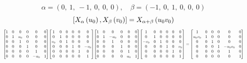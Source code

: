 \documentclass[11pt]{article}
\theoremstyle{definition}
\begin{document}
\[
\alpha = \left( 0, \  1, \  -1, \  0, \  0, \  0\right), \quad \beta = \left( -1, \  0, \  1, \  0, \  0, \  0\right)
\]
\[
\scaletoalign{\textwidth}{\left[ X_{\alpha}\left(u_{0}\right), X_{\beta}\left(v_{0}\right) \right] = X_{\alpha + \beta}\left(u_{0} v_{0}\right)}
\]
\[
\scaletoalign{\textwidth}{{\left[\begin{matrix}1 & 0 & 0 & 0 & 0 & 0\\0 & 1 & u_{0} & 0 & 0 & 0\\0 & 0 & 1 & 0 & 0 & 0\\0 & 0 & 0 & 1 & 0 & 0\\0 & 0 & 0 & 0 & 1 & 0\\0 & 0 & 0 & 0 & - u_{0} & 1\end{matrix}\right]} {\left[\begin{matrix}1 & 0 & 0 & 0 & 0 & 0\\0 & 1 & 0 & 0 & 0 & 0\\v_{0} & 0 & 1 & 0 & 0 & 0\\0 & 0 & 0 & 1 & 0 & - v_{0}\\0 & 0 & 0 & 0 & 1 & 0\\0 & 0 & 0 & 0 & 0 & 1\end{matrix}\right]} {\left[\begin{matrix}1 & 0 & 0 & 0 & 0 & 0\\0 & 1 & - u_{0} & 0 & 0 & 0\\0 & 0 & 1 & 0 & 0 & 0\\0 & 0 & 0 & 1 & 0 & 0\\0 & 0 & 0 & 0 & 1 & 0\\0 & 0 & 0 & 0 & u_{0} & 1\end{matrix}\right]} {\left[\begin{matrix}1 & 0 & 0 & 0 & 0 & 0\\0 & 1 & 0 & 0 & 0 & 0\\- v_{0} & 0 & 1 & 0 & 0 & 0\\0 & 0 & 0 & 1 & 0 & v_{0}\\0 & 0 & 0 & 0 & 1 & 0\\0 & 0 & 0 & 0 & 0 & 1\end{matrix}\right]} = {\left[\begin{matrix}1 & 0 & 0 & 0 & 0 & 0\\u_{0} v_{0} & 1 & 0 & 0 & 0 & 0\\0 & 0 & 1 & 0 & 0 & 0\\0 & 0 & 0 & 1 & - u_{0} v_{0} & 0\\0 & 0 & 0 & 0 & 1 & 0\\0 & 0 & 0 & 0 & 0 & 1\end{matrix}\right]}}
\]
\end{document}
